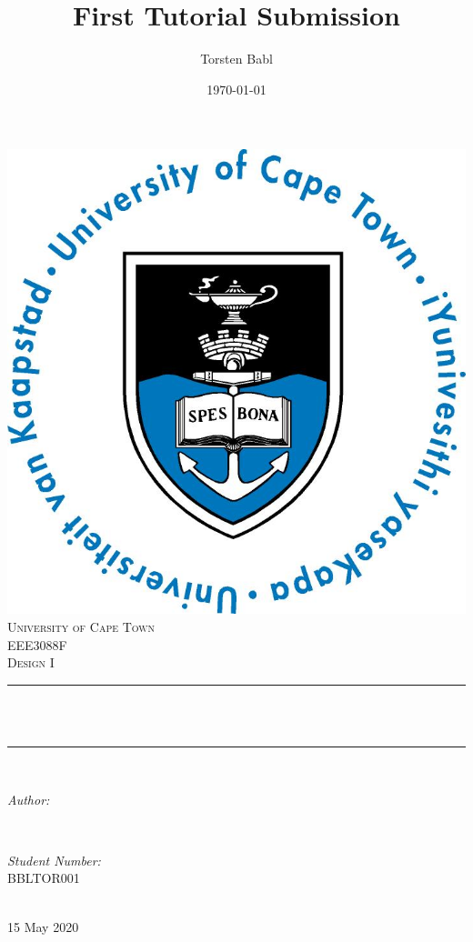 \documentclass[11pt]{article}
\title{First Tutorial Submission}								%
\author{Torsten Babl}			%
\date{\today}											  %
\makeatletter
\let\thetitle\@title
\let\theauthor\@author
\makeatother
\begin{document}

\begin{titlepage}
	\centering
    \vspace*{0.5 cm}
    \includegraphics[scale = 0.75]{UCT.jpg}\\[1.0 cm]	%
    \textsc{\LARGE University of Cape Town}\\[2.0 cm]	%
    \textsc{\Large EEE3088F}\\[0.5 cm]				%
    
	\textsc{\large Design I}\\[0.5 cm]				%
	\rule{\linewidth}{0.2 mm} \\[0.4 cm]
	{ \huge \bfseries \thetitle}\\
	\rule{\linewidth}{0.2 mm} \\[1.5 cm]
	
	\begin{minipage}{0.4\textwidth}
		\begin{flushleft} \large
			\emph{Author:}\\
			\theauthor
			\end{flushleft}
			\end{minipage}~
			\begin{minipage}{0.4\textwidth}
			\begin{flushright} \large
			\emph{Student Number:} \\
			BBLTOR001									%
		\end{flushright}
	\end{minipage}\\[2 cm]
	
	{\large 15 May 2020}\\[2 cm]
 
	\vfill
	
\end{titlepage}
\end{document}
